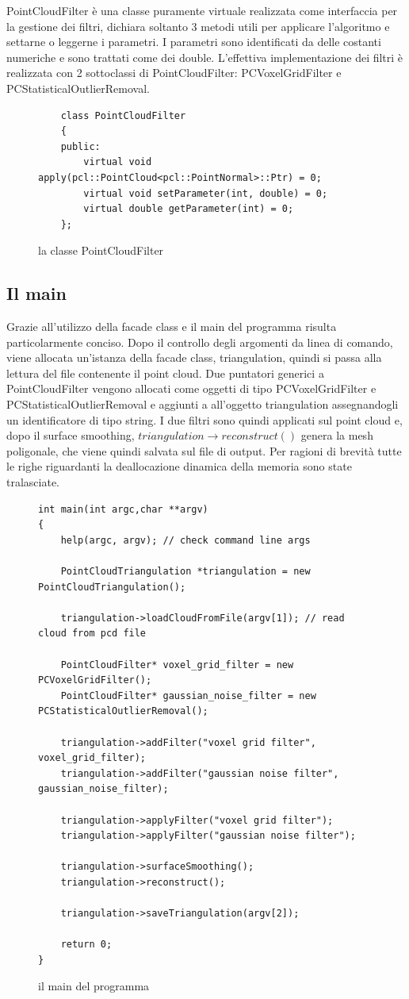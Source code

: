 \documentclass[a4paper,12pt]{article}
\begin{document}
	PointCloudFilter è una classe puramente virtuale realizzata come interfaccia per la gestione dei filtri,
	dichiara soltanto 3 metodi utili per applicare l'algoritmo e settarne o leggerne i parametri.
	I parametri sono identificati da delle costanti numeriche e sono trattati come dei double.
	L'effettiva implementazione dei filtri è realizzata con 2 sottoclassi di PointCloudFilter: PCVoxelGridFilter
	e PCStatisticalOutlierRemoval.
	\ 
	\begin{figure}[H]
	\begin{lstlisting}
	class PointCloudFilter
	{
	public:
    	virtual void apply(pcl::PointCloud<pcl::PointNormal>::Ptr) = 0;
    	virtual void setParameter(int, double) = 0;
    	virtual double getParameter(int) = 0;
	};
	\end{lstlisting}
	\label{fig:PointCloudFilter}
	\caption{la classe PointCloudFilter}
	\end{figure}
	\clearpage
	\subsection{Il main}
	Grazie all'utilizzo della facade class e il main del programma risulta particolarmente conciso.
	Dopo il controllo degli argomenti da linea di comando, viene allocata un'istanza della facade class, 
	triangulation, quindi si passa alla lettura del file contenente il point cloud. 
	Due puntatori generici a PointCloudFilter vengono allocati come oggetti di tipo PCVoxelGridFilter e
	PCStatisticalOutlierRemoval e aggiunti a all'oggetto triangulation assegnandogli un identificatore di
	tipo string. I due filtri sono quindi applicati sul point cloud e, dopo il surface smoothing, 
	$triangulation\rightarrow reconstruct()$ genera la mesh poligonale, che viene quindi salvata sul file di output.
	Per ragioni di brevità tutte le righe riguardanti la deallocazione dinamica della memoria sono state tralasciate.
	\begin{figure}[H]
	\begin{lstlisting}
int main(int argc,char **argv)
{
    help(argc, argv); // check command line args
    
    PointCloudTriangulation *triangulation = new PointCloudTriangulation();

    triangulation->loadCloudFromFile(argv[1]); // read cloud from pcd file

    PointCloudFilter* voxel_grid_filter = new PCVoxelGridFilter();
    PointCloudFilter* gaussian_noise_filter = new PCStatisticalOutlierRemoval();

    triangulation->addFilter("voxel grid filter", voxel_grid_filter);
    triangulation->addFilter("gaussian noise filter", gaussian_noise_filter);

    triangulation->applyFilter("voxel grid filter");
    triangulation->applyFilter("gaussian noise filter");

    triangulation->surfaceSmoothing();
    triangulation->reconstruct();

    triangulation->saveTriangulation(argv[2]);

    return 0;
}
	\end{lstlisting}
	\label{fig:main}
	\caption{il main del programma}	
	\end{figure}
	\clearpage
\end{document}
